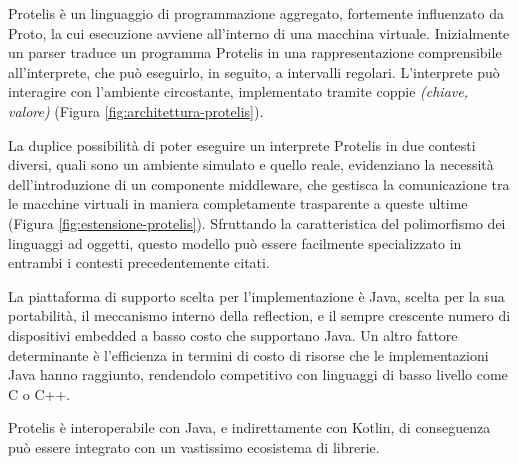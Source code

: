 Protelis è un linguaggio di programmazione aggregato, fortemente influenzato da
Proto\cite{Proto}, la cui esecuzione avviene all'interno di una macchina
virtuale\cite{Protelis}.  Inizialmente un parser traduce un programma Protelis
in una rappresentazione comprensibile all'interprete, che può eseguirlo, in
seguito, a intervalli regolari. L'interprete può interagire con l'ambiente
circostante, implementato tramite coppie \textit{(chiave, valore)} (Figura
\ref{fig:architettura-protelis}).

La duplice possibilità di poter eseguire un interprete Protelis in due contesti
diversi, quali sono un ambiente simulato e quello reale, evidenziano la
necessità dell'introduzione di un componente middleware, che gestisca la
comunicazione tra le macchine virtuali in maniera completamente trasparente a
queste ultime (Figura \ref{fig:estensione-protelis}). Sfruttando la
caratteristica del polimorfismo dei linguaggi ad oggetti, questo modello può
essere facilmente specializzato in entrambi i contesti precedentemente citati.

La piattaforma di supporto scelta per l'implementazione è Java, scelta per la
sua portabilità, il meccanismo interno della reflection, e il sempre crescente
numero di dispositivi embedded a basso costo che supportano Java. Un altro
fattore determinante è l'efficienza in termini di costo di risorse che le
implementazioni Java hanno raggiunto, rendendolo competitivo con linguaggi di
basso livello come C o C++.

Protelis è interoperabile con Java, e indirettamente con Kotlin, di conseguenza
può essere integrato con un vastissimo ecosistema di librerie.
